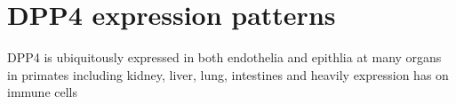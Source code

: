\section{DPP4 expression patterns}
DPP4 is ubiquitously expressed in both endothelia and epithlia at many organs in primates including kidney, liver, lung, intestines and heavily expression has on immune cells